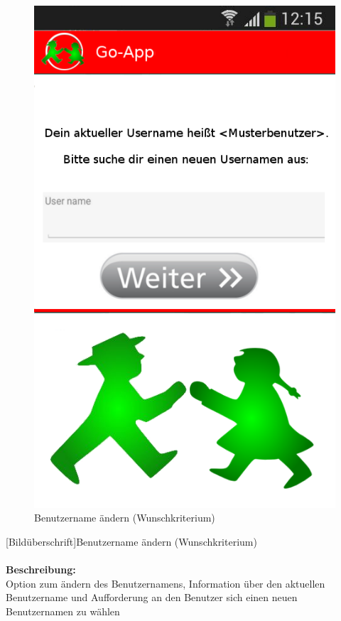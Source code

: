\begin{figure} [H]
	\caption{Benutzername ändern (Wunschkriterium)}
\begin{center}
	\includegraphics[scale =0.5]{resources/images/username_aendern.png}
\end{center}
\end{figure}
[Bildüberschrift]Benutzername ändern (Wunschkriterium)\\ \\
\textbf{Beschreibung:}\\
Option zum ändern des Benutzernamens, Information über den aktuellen Benutzername und Aufforderung an den Benutzer sich einen neuen Benutzernamen zu wählen\\
